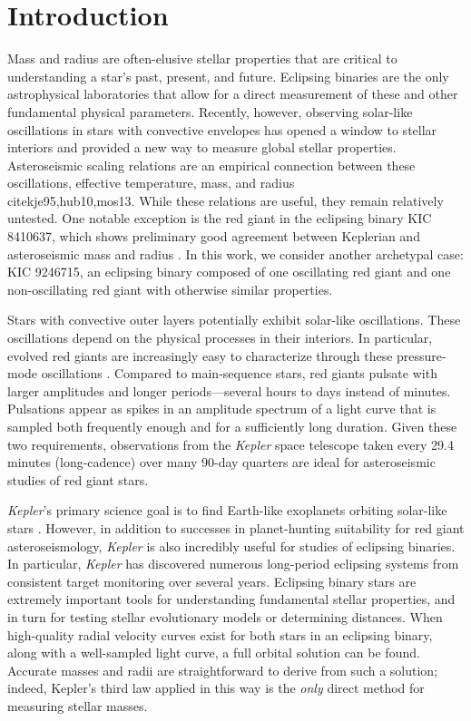 \section{Introduction}\label{intro}

Mass and radius are often-elusive stellar properties that are critical to understanding a star's past, present, and future. Eclipsing binaries are the only astrophysical laboratories that allow for a direct measurement of these and other fundamental physical parameters. Recently, however, observing solar-like oscillations in stars with convective envelopes has opened a window to stellar interiors and provided a new way to measure global stellar properties. Asteroseismic scaling relations are an empirical connection between these oscillations, effective temperature, mass, and radius \\cite{kje95,hub10,mos13}. While these relations are useful, they remain relatively untested. One notable exception is the red giant in the eclipsing binary KIC 8410637, which shows preliminary good agreement between Keplerian and asteroseismic mass and radius \citep{fra13}. In this work, we consider another archetypal case: KIC 9246715, an eclipsing binary composed of one oscillating red giant and one non-oscillating red giant with otherwise similar properties.

Stars with convective outer layers potentially exhibit solar-like oscillations. These oscillations depend on the physical processes in their interiors. In particular, evolved red giants are increasingly easy to characterize through these pressure-mode oscillations \citep[for a review of this topic, see][]{cha13}. Compared to main-sequence stars, red giants pulsate with larger amplitudes and longer periods---several hours to days instead of minutes. Pulsations appear as spikes in an amplitude spectrum of a light curve that is sampled both frequently enough and for a sufficiently long duration. Given these two requirements, observations from the \emph{Kepler} space telescope taken every 29.4 minutes (long-cadence) over many 90-day quarters are ideal for asteroseismic studies of red giant stars.

\emph{Kepler}'s primary science goal is to find Earth-like exoplanets orbiting solar-like stars \citep{bor10}. However, in addition to successes in planet-hunting suitability for red giant asteroseismology, \emph{Kepler} is also incredibly useful for studies of eclipsing binaries. In particular, \emph{Kepler} has discovered numerous long-period eclipsing systems from consistent target monitoring over several years. Eclipsing binary stars are extremely important tools for understanding fundamental stellar properties, and in turn for testing stellar evolutionary models or determining distances. When high-quality radial velocity curves exist for both stars in an eclipsing binary, along with a well-sampled light curve, a full orbital solution can be found. Accurate masses and radii are straightforward to derive from such a solution; indeed, Kepler's third law applied in this way is the \emph{only} direct method for measuring stellar masses.

